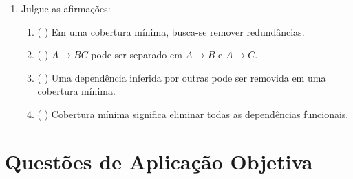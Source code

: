 \documentclass[12pt,a4paper]{article}
\begin{document}
\begin{enumerate}[resume,label=\textbf{Q\arabic*.}]
\item Julgue as afirmações:

\begin{enumerate}[label=\alph*)]
    \item ( \quad ) Em uma cobertura mínima, busca-se remover redundâncias.
    \item ( \quad ) $A \rightarrow BC$ pode ser separado em $A \rightarrow B$ e $A \rightarrow C$.
    \item ( \quad ) Uma dependência inferida por outras pode ser removida em uma cobertura mínima.
    \item ( \quad ) Cobertura mínima significa eliminar todas as dependências funcionais.
\end{enumerate}

\end{enumerate}

\section{Questões de Aplicação Objetiva}
\end{document}
